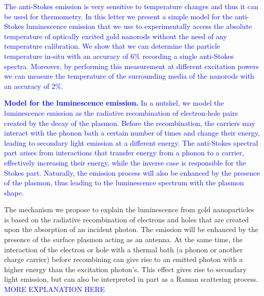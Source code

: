 \documentclass[journal=nalefd,manuscript=letter]{achemso}
\newcommand{\HI}[1]{\textcolor{blue}{#1}} %
\begin{document}

\HI{The anti-Stokes emission is very sensitive to temperature changes and thus 
it can be used for thermometry\cite{xie2016thermometry}. In this letter we present 
a simple model for the anti-Stokes luminescence emission that we use to experimentally 
access the absolute temperature of optically excited gold nanorods without the need of 
any temperature calibration. We show that we can determine the particle temperature 
in-situ with an accuracy of $6\%$ recording a single anti-Stokes spectra. 
Moreover, by performing this measurement at different excitation powers 
we can measure the temperature of the surrounding media 
of the nanorods with an accuracy of $2\%$.}

\HI{\textbf{Model for the luminescence emission.} 
In a nutshel, we model the luminescence emission as the radiative recombination of
electron-hole pairs created by the decay of the plasmon. Before the recombination,
the carriers may interact with the phonon bath a certain number of times and
change their energy, leading to secondary light emission at a different energy. 
The anti-Stokes spectral part arises from interactions that transfer  energy 
from a phonon to a carrier, effectively increasing their energy, while the inverse case is responsible for the Stokes
part. Naturally, the emission process will also 
be enhanced by the presence of the plasmon, thus leading to the luminescence spectrum with the plasmon shape.}


The mechanism we propose to explain the luminescence from gold nanoparticles is
based on the radiative recombination of electrons and holes that are created
upon the absorption of an incident photon\cite{Dulkeith2004,Mooradian1969}. The
emission will be enhanced by the presence of the surface plasmon acting as an
antenna\cite{Mohamed2000}. At the same time, the interaction
of the electron or hole with a thermal bath (a phonon or another charge carrier) before
recombining can give rise to an emitted photon with a higher energy than the
excitation photon's\cite{Hodak2000,Giri2015,Arbouet2003a}.
This effect gives rise to secondary light emission, but can also be interpreted in part as a Raman scattering
process.\cite{Huang2014} \HI{MORE EXPLANATION HERE}
\end{document}
